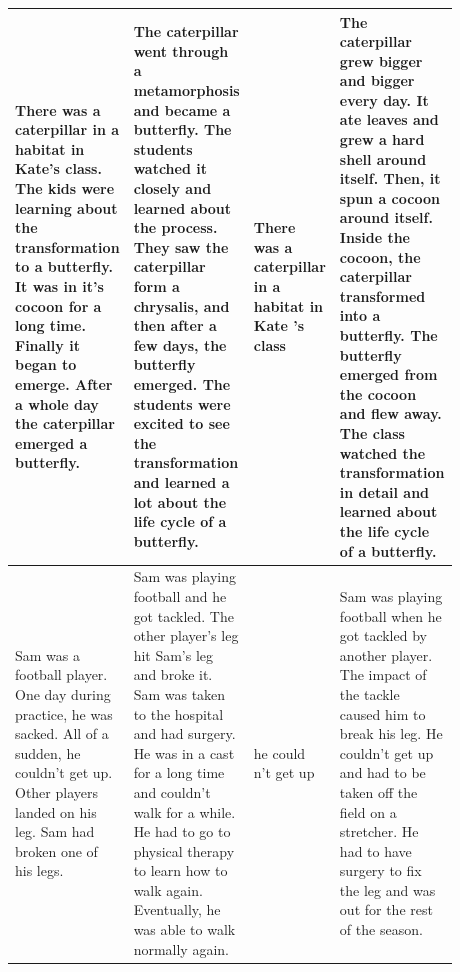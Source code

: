 \begin{table}[htp!]
\begin{tabular}{|p{0.24\linewidth}|p{0.26\linewidth}|p{0.12\linewidth}|p{0.26\linewidth}|}
There was a caterpillar in a habitat in Kate's class. The kids were learning about the transformation to a butterfly. It was in it's cocoon for a long time. Finally it began to emerge. After a whole day the caterpillar emerged a butterfly.
& The caterpillar went through a metamorphosis and became a butterfly. The students watched it closely and learned about the process. They saw the caterpillar form a chrysalis, and then after a few days, the butterfly emerged. The students were excited to see the transformation and learned a lot about the life cycle of a butterfly.
& There was a caterpillar in a habitat in Kate 's class
& The caterpillar grew bigger and bigger every day. It ate leaves and grew a hard shell around itself. Then, it spun a cocoon around itself. Inside the cocoon, the caterpillar transformed into a butterfly. The butterfly emerged from the cocoon and flew away. The class watched the transformation in detail and learned about the life cycle of a butterfly. \\ \hline

Sam was a football player. One day during practice, he was sacked. All of a sudden, he couldn't get up. Other players landed on his leg. Sam had broken one of his legs.
& Sam was playing football and he got tackled. The other player's leg hit Sam's leg and broke it. Sam was taken to the hospital and had surgery. He was in a cast for a long time and couldn't walk for a while. He had to go to physical therapy to learn how to walk again. Eventually, he was able to walk normally again.
& he could n't get up
& Sam was playing football when he got tackled by another player. The impact of the tackle caused him to break his leg. He couldn't get up and had to be taken off the field on a stretcher. He had to have surgery to fix the leg and was out for the rest of the season. \\ \hline


\end{tabular}
\end{table}
